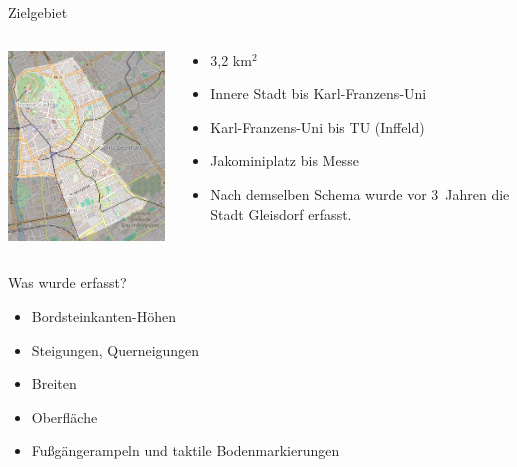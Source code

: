 \documentclass{beamer}
\begin{document}
\begin{frame}{Zielgebiet}

  \begin{columns}[c]
    \begin{column}[T]{.6\textwidth}
      \begin{center}
      \vspace{-1cm}
      \includegraphics[width=6cm]{gebiet.png}
      \end{center}
    \end{column}
    \begin{column}[T]{.4\textwidth}
      \begin{itemize}
            \item 3,2 km$^2$
            \item Innere Stadt bis Karl-Franzens-Uni
    \item       Karl-Franzens-Uni bis TU (Inffeld)
  \item       Jakominiplatz bis Messe
    \vspace{1cm}
  \item       Nach demselben Schema wurde vor 3~Jahren die Stadt Gleisdorf erfasst.
    \end{itemize}

    \end{column}
  \end{columns}

\end{frame}

\begin{frame}{Was wurde erfasst?}

    \begin{itemize}
      \item Bordsteinkanten-Höhen
      \item Steigungen, Querneigungen
      \item Breiten
      \item Oberfläche
      \item Fußgängerampeln und taktile Bodenmarkierungen
    \end{itemize}


\end{frame}
\end{document}
